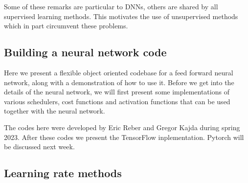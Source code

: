 \documentclass[%
oneside,                 %
final,                   %
10pt]{article}
\begin{document}
\noindent
Some of these remarks are particular to DNNs, others are shared by all supervised learning methods. This motivates the use of unsupervised methods which in part circumvent these problems.

\subsection{Building a neural network code}

Here we  present a flexible object oriented codebase
for a feed forward neural network, along with a demonstration of how
to use it. Before we get into the details of the neural network, we
will first present some implementations of various schedulers, cost
functions and activation functions that can be used together with the
neural network.

The codes here were developed by Eric Reber and Gregor Kajda during spring 2023.
After these codes we present the TensorFlow inplementation. Pytorch will be discussed next week.

\subsection{Learning rate methods}
\end{document}
